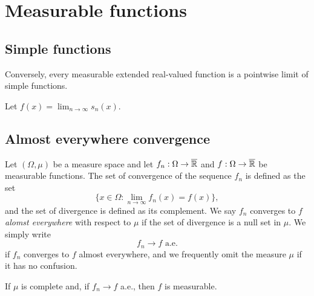 \documentclass{../../large}
\begin{document}
\chapter{Measurable functions}



\section{Simple functions}
\begin{prb}

Conversely, every measurable extended real-valued function is a pointwise limit of simple functions.

\end{prb}
\begin{pf}
Let $f(x)=\lim_{n\to\infty}s_n(x)$.

\end{pf}


\section{Almost everywhere convergence}

\begin{prb}
Let $(\Omega,\mu)$ be a measure space and let $f_n:\Omega\to\overline{\mathbb{R}}$ and $f:\Omega\to\overline{\mathbb{R}}$ be measurable functions.
The set of convergence of the sequence $f_n$ is defined as the set
\[\{x\in\Omega:\lim_{n\to\infty}f_n(x)=f(x)\},\]
and the set of divergence is defined as its complement.
We say $f_n$ converges to $f$ \emph{alomst everywhere} with respect to $\mu$ if the set of divergence is a null set in $\mu$.
We simply write
\[f_n\to f\text{ a.e.}\]
if $f_n$ converges to $f$ almost everywhere, and we frequently omit the measure $\mu$ if it has no confusion.
\begin{parts}
\item If $\mu$ is complete and, if $f_n\to f$ a.e., then $f$ is measurable.
\end{parts}
\end{prb}
\end{document}
